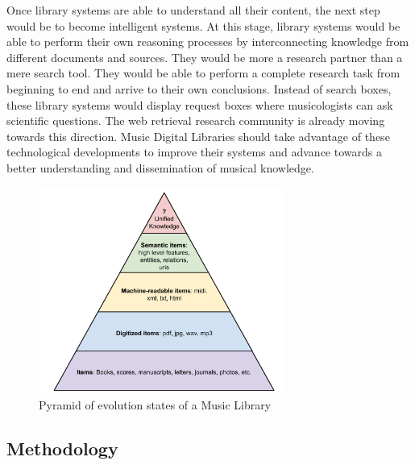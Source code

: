 Once library systems are able to understand all their content, the next step would be to become intelligent systems. At this stage, library systems would be able to perform their own reasoning processes by interconnecting knowledge from different documents and sources. They would be more a research partner than a mere search tool. They would be able to perform a complete research task from beginning to end and arrive to their own conclusions. Instead of search boxes, these library systems would display request boxes where musicologists can ask scientific questions. The web retrieval research community is already moving towards this direction. Music Digital Libraries should take advantage of these technological developments to improve their systems and advance towards a better understanding and dissemination of musical knowledge.

\begin{figure}[!ht]
	\centering
	\includegraphics[width=8cm]{ch05_musicology_pics/evolution-dl.jpg}
	\caption{Pyramid of evolution states of a Music Library
	\label{fig:musicology:pyramid}}
\end{figure}


\subsection{Methodology}

